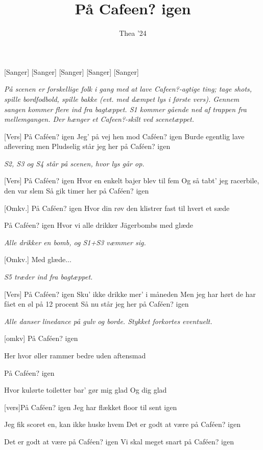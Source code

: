 \documentclass[a4paper,11pt]{article}
\title{På Cafeen? igen}
\author{Thea '24}
\begin{document}
\maketitle

\begin{roles}
[Sanger] 
[Sanger]
[Sanger]
[Sanger]
[Sanger]
\end{roles}


\begin{song}


\textit{På scenen er forskellige folk i gang med at lave Cafeen?-agtige ting; tage shots, spille bordfodbold, spille bakke (evt. med dæmpet lys i første vers). Gennem sangen kommer flere ind fra bagtæppet.
S1 kommer gående ned af trappen fra mellemgangen. Der hænger et Cafeen?-skilt ved scenetæppet. }


[Vers] På Caféen? igen
Jeg' på vej hen mod Caféen? igen
Burde egentlig lave aflevering men
Pludselig står jeg her på Caféen? igen

\textit{S2, S3 og S4 står på scenen, hvor lys går op.}

[Vers] På Caféen? igen 
Hvor en enkelt bajer blev til fem
Og så tabt' jeg racerbile, den var slem
Så gik timer her på Caféen? igen

[Omkv.] På Caféen? igen
Hvor din røv den klistrer fast til hvert et sæde

På Caféen? igen
Hvor vi alle drikker Jägerbombs med glæde

\textit{Alle drikker en bomb, og S1+S3 væmmer sig.}

[Omkv.] Med glæde...

\textit{S5 træder ind fra bagtæppet.}

[Vers] På Caféen? igen
Sku' ikke drikke mer' i måneden
Men jeg har hørt de har fået en øl på 12 procent
Så nu står jeg her på Caféen? igen

\textit{Alle danser linedance på gulv og borde. Stykket forkortes eventuelt.}

[omkv] På Caféen? igen

 Her hvor øller rammer bedre uden aftensmad

 På Caféen? igen

 Hvor kulørte toiletter bar' gør mig glad
Og dig glad 

[vers]På Caféen? igen 
Jeg har flækket floor til sent igen

Jeg fik scoret en, kan ikke huske hvem
Det er godt at være på Caféen? igen

 Det er godt at være på Caféen? igen
Vi skal meget snart på Caféen? igen
\end{song}
\end{document}
